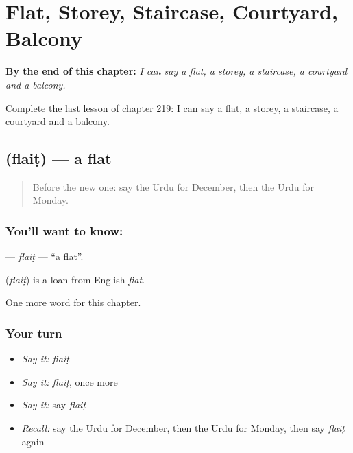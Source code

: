 
\chapter{Flat, Storey, Staircase, Courtyard, Balcony}
\label{ch:ur-flat-storey-staircase-courtyard-balcony}

\begin{chapteropening}
\textbf{By the end of this chapter:} \emph{I can say a flat, a storey, a staircase, a courtyard and a balcony.}

Complete the last lesson of chapter 219: I can say a flat, a storey, a staircase, a courtyard and a balcony.
\end{chapteropening}

\section[\texorpdfstring{\ur{فلیٹ} (flaiṭ)}{فلیٹ (flaiṭ)}]{ (flaiṭ) — a flat}

\label{lesson:UR-C219-flait}



\begin{quote}
Before the new one: say the Urdu for December, then the Urdu for Monday.
\end{quote}

\subsection*{You'll want to know: }
\textbf{} — \emph{flaiṭ} — \textquotedblleft{}a flat\textquotedblright{}.

\begin{cousinweb}
\textbf{} (\emph{flaiṭ}) is a loan from English \emph{flat}.
\end{cousinweb}

\begin{grammarlens}[title={What you've built}]
One more word for this chapter.
\end{grammarlens}

\subsection*{Your turn}
\begin{itemize}
\raggedright
  \item \emph{Say it:} \emph{flaiṭ}
  \item \emph{Say it:} \emph{flaiṭ}, once more
  \item \emph{Say it:} say \emph{flaiṭ}
  \item \emph{Recall:} say the Urdu for December, then the Urdu for Monday, then say \emph{flaiṭ} again
\end{itemize}

